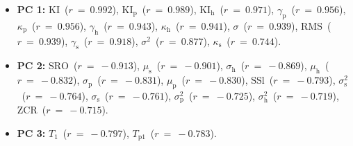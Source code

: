 \begin{itemize}
	\item {\bf{PC 1:}} $\textrm{KI}$~($r~=~0.992$), $\textrm{KI}_{\textrm{p}}$~($r~=~0.989$), $\textrm{KI}_{\textrm{h}}$~($r~=~0.971$), $\gamma_{\textrm{p}}$~($r~=~0.956$), $\kappa_{\textrm{p}}$~($r~=~0.956$), $\gamma_{\textrm{h}}$~($r~=~0.943$), $\kappa_{\textrm{h}}$~($r~=~0.941$), $\sigma$~($r~=~0.939$), $\textrm{RMS}$~($r~=~0.939$), $\gamma_{\textrm{s}}$~($r~=~0.918$), $\sigma^{2}$~($r~=~0.877$), $\kappa_{\textrm{s}}$~($r~=~0.744$).
	\item {\bf{PC 2:}} $\textrm{SRO}$~($r~=~-0.913$), $\mu_{\textrm{s}}$~($r~=~-0.901$), $\sigma_{\textrm{h}}$~($r~=~-0.869$), $\mu_{\textrm{h}}$~($r~=~-0.832$), $\sigma_{\textrm{p}}$~($r~=~-0.831$), $\mu_{\textrm{p}}$~($r~=~-0.830$), $\textrm{SSl}$~($r~=~-0.793$), $\sigma_{\textrm{s}}^{2}$~($r~=~-0.764$), $\sigma_{\textrm{s}}$~($r~=~-0.761$), $\sigma_{\textrm{p}}^{2}$~($r~=~-0.725$), $\sigma_{\textrm{h}}^{2}$~($r~=~-0.719$), $\textrm{ZCR}$~($r~=~-0.715$).
	\item {\bf{PC 3:}} $T_{1}$~($r~=~-0.797$), $T_{\textrm{p}1}$~($r~=~-0.783$).
\end{itemize}
